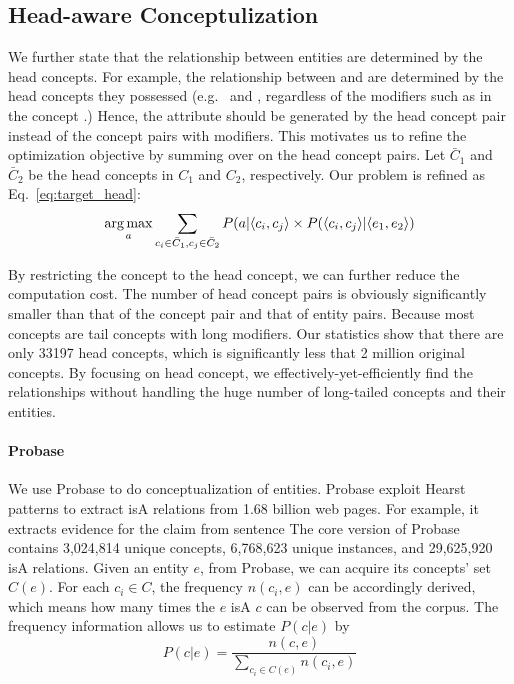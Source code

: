 \subsection{Head-aware Conceptulization}
We further state that the relationship between entities are determined by the head concepts.
For example, the  relationship between  and  are determined by the head concepts they possessed (e.g.\  and , regardless of the modifiers such as  in the concept .)
Hence, the attribute should be generated by the head concept pair instead of the concept pairs with modifiers.
This motivates us to refine the optimization objective by summing over on the head concept pairs.
Let $\bar{C}_1$ and $\bar{C}_2$ be the head concepts in  $C_1$ and $C_2$, respectively.
Our problem is refined as Eq.~\ref{eq:target_head}:
\begin{equation}
\label{eq:target_head}
\operatorname*{arg\,max}_a \sum_{c_i\in \bar{C}_1 , c_j \in \bar{C}_2 } P(a|\langle c_{i},c_{j} \rangle \times P(\langle c_{i},c_{j}\rangle|\langle e_{1},e_{2}\rangle)
\end{equation}

By restricting the concept to the head concept, we can further reduce the computation cost.
The number of head concept pairs is obviously significantly smaller than that of the concept pair and that of entity pairs.
Because most concepts are tail concepts with long modifiers.
Our statistics show that there are only 33197 head concepts, which is significantly less that 2 million original concepts.
By focusing on head concept, we effectively-yet-efficiently find the relationships without handling the huge number of long-tailed concepts and their entities.

\paragraph*{Probase}
We use Probase to do conceptualization of entities.  Probase exploit Hearst patterns to extract isA relations from 1.68 billion web pages. For example, it extracts evidence for the claim  from sentence 
The core version of Probase contains 3,024,814 unique concepts, 6,768,623 unique instances, and 29,625,920 isA relations.
Given an entity $e$, from Probase, we can acquire its concepts' set $C(e)$.
For each $c_i \in C$, the frequency $n(c_i,e)$ can be accordingly derived, which means how many times the $e$ isA $c$ can be observed from the corpus.
The frequency information allows us to estimate  $P(c|e)$ by
$$P(c|e)=\frac{n(c,e)}{\sum_{c_i\in C(e)}n(c_i, e)}$$

